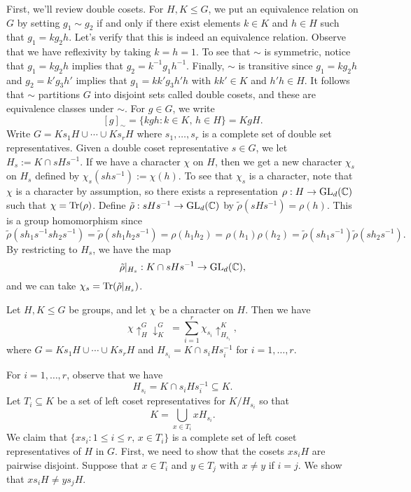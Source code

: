 First, we'll review double cosets. For $H, K \leq G$, we put an equivalence 
relation on $G$ by setting $g_1 \sim g_2$ if and only if there exist elements
$k \in K$ and $h \in H$ such that $g_1 = kg_2h$. Let's verify that this is 
indeed an equivalence relation. Observe that we have reflexivity by 
taking $k = h = 1$. To see that $\sim$ is symmetric, notice that $g_1 = 
kg_2h$ implies that $g_2 = k^{-1}g_1h^{-1}$. Finally, $\sim$ is transitive 
since $g_1 = kg_2h$ and $g_2 = k'g_3h'$ implies that $g_1 = kk'g_3h'h$ with 
$kk' \in K$ and $h'h \in H$. It follows that $\sim$ partitions $G$ 
into disjoint sets called double cosets, and these are equivalence classes 
under $\sim$. For $g \in G$, we write 
\[ [g]_{\sim} = \{kgh : k\in K,\, h\in H\} = KgH. \] 
Write $G = Ks_1H \cup \cdots \cup Ks_rH$ where $s_1, \dots, s_r$ is a 
complete set of double set representatives. Given a double coset 
representative $s \in G$, we let $H_s := K \cap sHs^{-1}$. If we have a 
character $\chi$ on $H$, then we get a new character $\chi_s$ on $H_s$ 
defined by $\chi_s(shs^{-1}) := \chi(h)$. To see that $\chi_s$ is a 
character, note that $\chi$ is a character by assumption, so there 
exists a representation $\rho : H \to \operatorname{GL}_d(\mathbb{C})$ such that $\chi = \operatorname{Tr}(\rho)$. 
Define $\tilde\rho : sHs^{-1} \to \operatorname{GL}_d(\mathbb{C})$ by $\tilde\rho(sHs^{-1}) = 
\rho(h)$. This is a group homomorphism since 
\[ \tilde\rho(sh_1s^{-1}sh_2s^{-1}) = \tilde\rho(sh_1h_2s^{-1}) = 
\rho(h_1h_2) = \rho(h_1)\rho(h_2) = \tilde\rho(sh_1s^{-1})\tilde\rho(sh_2s^{-1}). \] 
By restricting to $H_s$, we have the map 
\[ \tilde\rho|_{H_s} : K \cap sHs^{-1} \to \operatorname{GL}_d(\mathbb{C}), \] 
and we can take $\chi_s = \operatorname{Tr}(\tilde\rho|_{H_s})$. 

\begin{theo}{}
    Let $H, K \leq G$ be groups, and let $\chi$ be a character on $H$. Then 
    we have 
    \[ \chi \uparrow_H^G \downarrow_K^G \;= \sum_{i=1}^r \chi_{s_i} \uparrow_{H_{s_i}}^K, \] 
    where $G = Ks_1H \cup \cdots \cup Ks_rH$ and $H_{s_i} = K \cap s_iHs_i^{-1}$ for $i = 1, \dots, r$. 
\end{theo}

For $i = 1, \dots, r$, observe that we have 
\[ H_{s_i} = K \cap s_iHs_i^{-1} \subseteq K. \] 
Let $T_i \subseteq K$ be a set of left coset representatives for $K/H_{s_i}$ so that 
\[ K = \bigcup_{x \in T_i} xH_{s_i}. \] 
We claim that $\{xs_i : 1 \leq i \leq r,\, x \in T_i\}$ is a complete set 
of left coset representatives of $H$ in $G$. First, we need to show that 
the cosets $xs_iH$ are pairwise disjoint. Suppose that $x \in T_i$ and 
$y \in T_j$ with $x \neq y$ if $i = j$. We show that $xs_iH \neq ys_jH$. 

